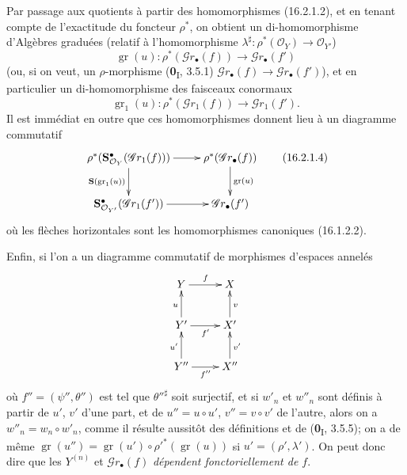 \begin{env}[16.2.1]
Par passage aux quotients à partir des homomorphismes (16.2.1.2), et en tenant
compte de l'exactitude du foncteur $\rho^*$, on obtient un di-homomorphisme
d'Algèbres graduées (relatif à l'homomorphisme
$\lambda^\sharp:\rho^*(\mathcal{O}_Y)\to\mathcal{O}_{Y'}$)
\[
  \operatorname{gr}(u):
  \rho^*(\mathscr{G}r_\bullet(f))
  \longrightarrow\mathscr{G}r_\bullet(f')
  \tag{16.2.1.3}
  \label{IV.16.2.1.3}
\]
(ou, si on veut, un $\rho$-morphisme (\textbf{0}\textsubscript{I}, 3.5.1)
$\mathscr{G}r_\bullet(f)\to\mathscr{G}r_\bullet(f')$), et en particulier un
di-homomorphisme des faisceaux conormaux
\[
  \operatorname{gr}_1(u):
  \rho^*(\mathscr{G}r_1(f))\longrightarrow\mathscr{G}r_1(f').
\]
Il est immédiat en outre que ces homomorphismes donnent lieu à un diagramme
commutatif
\[
  \xymatrix{
    \rho^*(\mathbf{S}_{\mathcal{O}_Y}^{\bullet}
      (\mathscr{G}r_1(f)))
      \ar[r] \ar[d]_-{\mathbf{S}(\operatorname{gr}_1(u))}
      & \rho^*(\mathscr{G}r_\bullet(f))
        \ar[d]^-{\operatorname{gr}(u)} \\
    \mathbf{S}_{\mathcal{O}_{Y'}}^{\bullet}
      (\mathscr{G}r_1(f'))
      \ar[r]
      & \mathscr{G}r_\bullet(f')
  }
  \tag{16.2.1.4}
  \label{IV.16.2.1.4}
\]
où les flèches horizontales sont les homomorphismes canoniques (16.1.2.2).

Enfin, si l'on a un diagramme commutatif de morphismes d'espaces annelés
\[
  \xymatrix{
    Y \ar[r]^f & X \\
    Y' \ar[r]_{f'} \ar[u]^u & X' \ar[u]_v \\
    Y'' \ar[r]_{f''} \ar[u]^{u'} & X'' \ar[u]_{v'}
  }
\]
où $f''=(\psi'',\theta'')$ est tel que $\theta''^\sharp$ soit surjectif, et si
$w'_n$ et $w''_n$ sont définis à partir de $u'$, $v'$ d'une part, et de
$u''=u\circ u'$, $v''=v\circ v'$ de l'autre, alors on a
$w''_n=w_n\circ w'_n$, comme il résulte aussitôt des définitions et de
(\textbf{0}\textsubscript{I}, 3.5.5); on a de même
$\operatorname{gr}(u'')=
\operatorname{gr}(u')\circ\rho'^*(\operatorname{gr}(u))$ si
$u'=(\rho',\lambda')$. On peut donc dire que les $Y^{(n)}$ et
$\mathscr{G}r_\bullet(f)$ \emph{dépendent fonctoriellement de $f$}.
\end{env}

